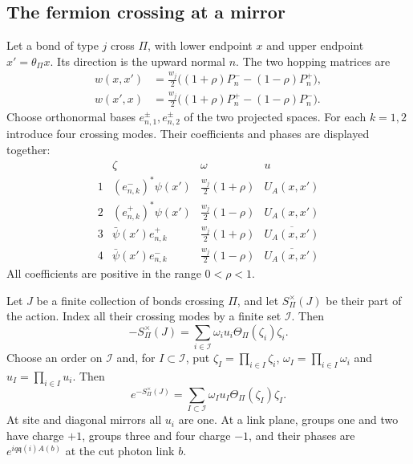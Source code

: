 \subsection{The fermion crossing at a mirror}\label{subsec:reg-crossing}

Let a bond of type $j$ cross $\Pi$, with lower endpoint $x$ and upper
endpoint $x'=\theta_\Pi x$. Its direction is the upward normal $n$.
The two hopping matrices are
\begin{equation}\label{eq:reg-crossing-projectors}
 \begin{split}
 w(x,x')&=\tfrac{w_j}{2}\bigl((1+\rho)P_n^--(1-\rho)P_n^+\bigr),\\
 w(x',x)&=\tfrac{w_j}{2}\bigl((1+\rho)P_n^+-(1-\rho)P_n^-\bigr).
 \end{split}
\end{equation}
Choose orthonormal bases $e_{n,1}^\pm,e_{n,2}^\pm$ of the two
projected spaces. For each $k=1,2$ introduce four crossing modes.
Their coefficients and phases are displayed together:
\begin{equation}\label{eq:reg-crossing-modes}
\begin{array}{c|c|c|c}
 &\zeta&\omega&u\\ \hline
 1&(e_{n,k}^-)^*\psi(x')&\tfrac{w_j}{2}(1+\rho)&U_A(x,x')\\
 2&(e_{n,k}^+)^*\psi(x')&\tfrac{w_j}{2}(1-\rho)&U_A(x,x')\\
 3&\bar\psi(x')e_{n,k}^+&\tfrac{w_j}{2}(1+\rho)&\overline{U_A(x,x')}\\
 4&\bar\psi(x')e_{n,k}^-&\tfrac{w_j}{2}(1-\rho)&\overline{U_A(x,x')}
\end{array}
\end{equation}
All coefficients are positive in the range $0<\rho<1$.

\begin{proposition}\label{prop:reg-crossing-expansion}
Let $J$ be a finite collection of bonds crossing $\Pi$, and let
$S_\Pi^\times(J)$ be their part of the action. Index all their crossing
modes by a finite set $\mathcal I$. Then
\begin{equation}\label{eq:reg-crossing-positive}
 -S_\Pi^\times(J)=\sum_{i\in\mathcal I}\omega_i u_i\Theta_\Pi(\zeta_i)\zeta_i.
\end{equation}
Choose an order on $\mathcal I$ and, for $I\subset\mathcal I$, put
$\zeta_I=\prod_{i\in I}\zeta_i$, $\omega_I=\prod_{i\in I}\omega_i$
and $u_I=\prod_{i\in I}u_i$. Then
\begin{equation}\label{eq:reg-crossing-exponential}
 e^{-S_\Pi^\times(J)}=\sum_{I\subset\mathcal I}\omega_Iu_I\Theta_\Pi(\zeta_I)\zeta_I.
\end{equation}
At site and diagonal mirrors all $u_i$ are one. At a link plane,
groups one and two have charge $+1$, groups three and four charge
$-1$, and their phases are $e^{iq\mathfrak q(i)A(b)}$ at the cut
photon link $b$.
\end{proposition}

